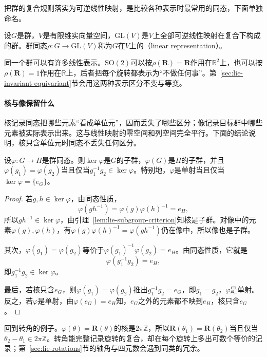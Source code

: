 把群的复合规则落实为可逆线性映射，是比较各种表示时最常用的同态，下面单独命名。

\begin{definition}[线性表示]
\label{def:lie-linear-representation}
设$G$是群，$V$是有限维实向量空间，$\mathrm{GL}(V)$是$V$上全部可逆线性映射在复合下构成的群。群同态$\rho:G\to\mathrm{GL}(V)$称为$G$在$V$上的（linear representation）。
\end{definition}

同一个群可以有许多线性表示。$\mathrm{SO}(2)$可以按$\rho(\bm R)=\bm R$作用在$\mathbb R^2$上，也可以按$\rho(\bm R)=1$作用在$\mathbb R$上，后者把每个旋转都表示为“不做任何事”。第~\ref{sec:lie-invariant-equivariant}节会用这两种表示区分不变与等变。

\paragraph{核与像保留什么}
核记录同态把哪些元素“看成单位元”，因而丢失了哪些区分；像记录目标群中哪些元素被实际表示出来。这与线性映射的零空间和列空间完全平行。下面的结论说明，核只含单位元时同态不丢失任何区分。

\begin{theorem}[核与单射]
\label{thm:lie-kernel-injective}
设$\varphi:G\to H$是群同态。则$\ker\varphi$是$G$的子群，$\varphi(G)$是$H$的子群，并且$\varphi(g_1)=\varphi(g_2)$当且仅当$g_1^{-1}g_2\in\ker\varphi$。特别地，$\varphi$是单射当且仅当$\ker\varphi=\{e_G\}$。
\end{theorem}

\begin{proof}
若$g,h\in\ker\varphi$，由同态性质，
\[
\varphi(gh^{-1})=\varphi(g)\varphi(h)^{-1}=e_H,
\]
所以$gh^{-1}\in\ker\varphi$，由引理~\ref{lem:lie-subgroup-criterion}知核是子群。对像中的元素$\varphi(g),\varphi(h)$，有$\varphi(g)\varphi(h)^{-1}=\varphi(gh^{-1})$仍在像中，所以像也是子群。

其次，$\varphi(g_1)=\varphi(g_2)$等价于$\varphi(g_1)^{-1}\varphi(g_2)=e_H$。由同态性质，它就是
\[
\varphi(g_1^{-1}g_2)=e_H,
\]
即$g_1^{-1}g_2\in\ker\varphi$。

最后，若核只含$e_G$，则$\varphi(g_1)=\varphi(g_2)$推出$g_1^{-1}g_2=e_G$，即$g_1=g_2$，$\varphi$是单射。反之，若$\varphi$是单射，由$\varphi(e_G)=e_H$知，$e_G$之外的元素都不映到$e_H$，核只含$e_G$。
\end{proof}

回到转角的例子。$\varphi(\theta)=\bm R(\theta)$的核是$2\pi\mathbb Z$，所以$\bm R(\theta_1)=\bm R(\theta_2)$当且仅当$\theta_2-\theta_1\in2\pi\mathbb Z$。转角能完整记录旋转的复合，却在每个旋转上多出可数个等价的记录；第~\ref{sec:lie-rotations}节的轴角与四元数会遇到同类的冗余。

